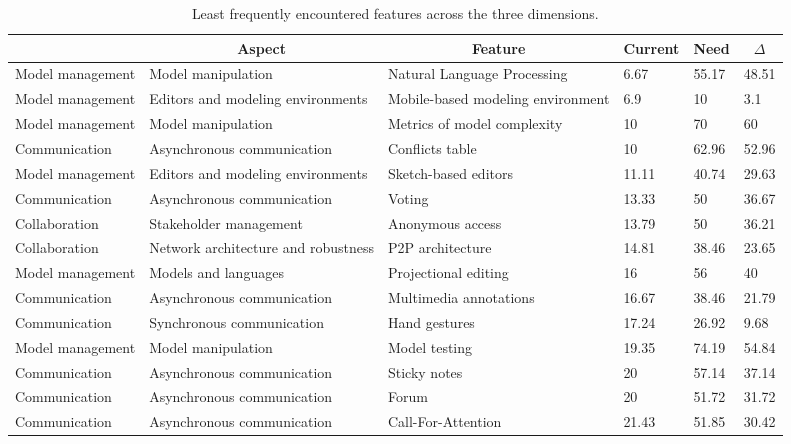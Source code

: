 
  \begin{table*}[]
  \centering
  \notsotiny
  \caption{ Least frequently encountered features across the three dimensions.}
\label{tab:least-frequent}
\begin{tabular}{|l|l|l|l|l|l|}
  \hline
  \rowcolor[HTML]{C0C0C0}
    \multicolumn{1}{|c|}{Dimension} & \multicolumn{1}{c|}{Aspect} & \multicolumn{1}{c|}{Feature} & \multicolumn{1}{c|}{Current} & \multicolumn{1}{c|}{Need} & \multicolumn{1}{c|}{$\Delta$} \\ \hline
    Model management & Model manipulation & Natural Language Processing & 6.67 & 55.17 & 48.51 \\ \hline 
Model management & Editors and modeling environments & Mobile-based modeling environment & 6.9 & 10 & 3.1 \\ \hline 
Model management & Model manipulation & Metrics of model complexity & 10 & 70 & 60 \\ \hline 
Communication & Asynchronous communication & Conflicts table & 10 & 62.96 & 52.96 \\ \hline 
Model management & Editors and modeling environments & Sketch-based editors & 11.11 & 40.74 & 29.63 \\ \hline 
Communication & Asynchronous communication & Voting & 13.33 & 50 & 36.67 \\ \hline 
Collaboration & Stakeholder management & Anonymous access & 13.79 & 50 & 36.21 \\ \hline 
Collaboration & Network architecture and robustness & P2P architecture & 14.81 & 38.46 & 23.65 \\ \hline 
Model management & Models and languages & Projectional editing & 16 & 56 & 40 \\ \hline 
Communication & Asynchronous communication & Multimedia annotations & 16.67 & 38.46 & 21.79 \\ \hline 
Communication & Synchronous communication & Hand gestures & 17.24 & 26.92 & 9.68 \\ \hline 
Model management & Model manipulation & Model testing & 19.35 & 74.19 & 54.84 \\ \hline 
Communication & Asynchronous communication & Sticky notes & 20 & 57.14 & 37.14 \\ \hline 
Communication & Asynchronous communication & Forum & 20 & 51.72 & 31.72 \\ \hline 
Communication & Asynchronous communication & Call-For-Attention & 21.43 & 51.85 & 30.42 \\ \hline 

\end{tabular}
\end{table*}
